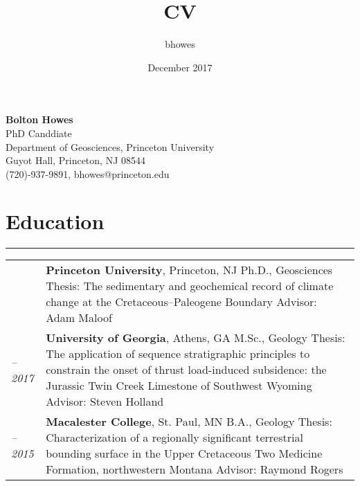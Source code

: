 \documentclass[letterpaper, 10pt]{article}
\title{CV}
\author{bhowes }
\date{December 2017}
\newcommand{\headings}[1]{\section*{#1} \hrule \vspace{10pt}}
\begin{document}
\begin{center}
{\Large \textbf{Bolton Howes}}\\
PhD Canddiate\\
Department of Geosciences, Princeton University\\
Guyot Hall, Princeton, NJ 08544\\
(720)-937-9891, bhowes@princeton.edu\\
\end{center}

\headings{Education}
\begin{center}
	\begin{tabularx}{\textwidth}{>{\itshape\arraybackslash}l X}
		2017 \rightarrow & \textbf{Princeton University}, Princeton, NJ \newline Ph.D., Geosciences \newline Thesis: The sedimentary and geochemical record of climate change at the Cretaceous--Paleogene Boundary  
		\newline Advisor: Adam Maloof \\
		2015--2017 & \textbf{University of Georgia}, Athens, GA \newline M.Sc., Geology \newline Thesis: The application of sequence stratigraphic principles to constrain the onset of thrust load-induced subsidence: the Jurassic Twin Creek Limestone of Southwest Wyoming
		\newline Advisor: Steven Holland\\
		2011--2015 & \textbf{Macalester College}, St. Paul, MN \newline B.A., Geology \newline Thesis: Characterization of a regionally significant terrestrial bounding surface in the Upper Cretaceous Two Medicine Formation, northwestern Montana \newline Advisor: Raymond Rogers\\
	\end{tabularx}
\end{center}
\end{document}
